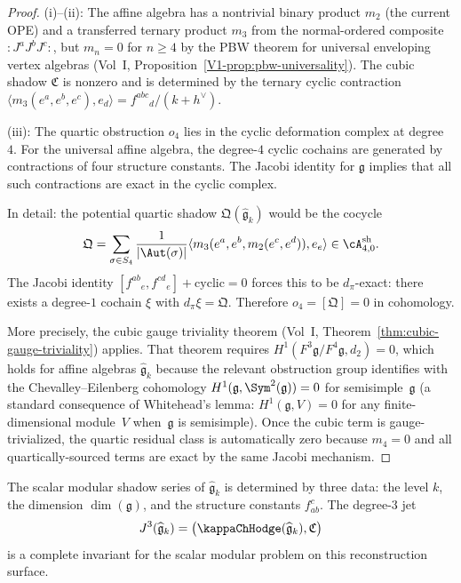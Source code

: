 \begin{proof}
(i)--(ii): The affine algebra has a nontrivial binary product $m_2$ (the current OPE)
and a transferred ternary product $m_3$ from the normal-ordered composite
$:J^a J^b J^c:$, but $m_n = 0$ for $n \geq 4$ by the PBW theorem for universal
enveloping vertex algebras (Vol~I, Proposition~\ref*{V1-prop:pbw-universality}). The
cubic shadow $\mathfrak{C}$ is nonzero and is determined by the ternary cyclic
contraction $\langle m_3(e^a, e^b, e^c), e_d \rangle = f^{abc}{}_d/(k + h^\vee)$.

(iii): The quartic obstruction $o_4$ lies in the cyclic deformation complex at
degree~$4$. For the universal affine algebra, the degree-$4$ cyclic cochains are
generated by contractions of four structure constants. The Jacobi identity for
$\mathfrak{g}$ implies that all such contractions are exact in the cyclic complex.

In detail: the potential quartic shadow $\mathfrak{Q}(\widehat{\mathfrak{g}}_k)$
would be the cocycle
\[
\mathfrak{Q} = \sum_{\sigma \in S_4}
\frac{1}{|\Aut(\sigma)|}
\langle m_3(e^a, e^b, m_2(e^c, e^d)), e_e \rangle
\in \cA^{\mathrm{sh}}_{4,0}.
\]
The Jacobi identity $[f^{ab}{}_e, f^{cd}{}_e] + \mathrm{cyclic} = 0$ forces this to
be $d_\pi$-exact: there exists a degree-$1$ cochain $\xi$ with
$d_\pi \xi = \mathfrak{Q}$. Therefore $o_4 = [\mathfrak{Q}] = 0$ in cohomology.

More precisely, the cubic gauge triviality theorem (Vol~I,
Theorem~\ref*{thm:cubic-gauge-triviality}) applies. That theorem requires
$H^1(F^3 \mathfrak{g}/F^4 \mathfrak{g}, d_2) = 0$, which holds for affine
algebras $\widehat{\mathfrak{g}}_k$ because the relevant obstruction group
identifies with the Chevalley--Eilenberg cohomology
$H^1(\mathfrak{g}, \Sym^2(\mathfrak{g})) = 0$ for semisimple~$\mathfrak{g}$
(a standard consequence of Whitehead's lemma: $H^1(\mathfrak{g}, V) = 0$
for any finite-dimensional module~$V$ when~$\mathfrak{g}$ is semisimple).
Once the cubic term is gauge-trivialized, the quartic
residual class is automatically zero because $m_4 = 0$ and all quartically-sourced
terms are exact by the same Jacobi mechanism.
\end{proof}

\begin{corollary}
The scalar modular shadow series of $\widehat{\mathfrak{g}}_k$ is determined by three
data: the level $k$, the dimension \(\dim(\mathfrak{g})\), and the structure constants
$f^c_{ab}$. The degree-$3$ jet
\[
J^3(\widehat{\mathfrak{g}}_k)
= \bigl(\kappaChHodge(\widehat{\mathfrak{g}}_k), \mathfrak{C}\bigr)
\]
is a complete invariant for the scalar modular problem on this reconstruction surface.
\end{corollary}

